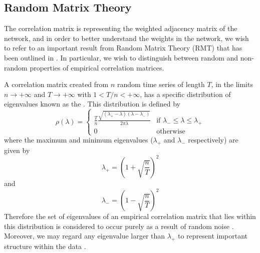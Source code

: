 
\subsection{Random Matrix Theory}
\label{subsec:randomMatrixTheory}

The correlation matrix is representing the weighted adjacency matrix of the network, and in order to better understand the weights in the network, we wish to refer to an important result from Random Matrix Theory (RMT) that has been outlined in \cite{SM99,PGR+99,PBL05,MG13}. In particular, we wish to distinguish between random and non-random properties of empirical correlation matrices.

A correlation matrix created from $n$ random time series of length $T$, in the limits $n \rightarrow +\infty$ and $T \rightarrow +\infty$ with $1 < T/n < +\infty$, has a specific distribution of eigenvalues known as the  \cite{SM99,PBL05,FPW+11,MG13}. This distribution is defined by 
\begin{equation}
	\label{def:senguptaMitraDistribution}
	\rho(\lambda) =	
	\begin{cases}
		\frac{T}{n}\frac{\sqrt{(\lambda_{+} - \lambda)(\lambda - \lambda_{-})}}{2\pi\lambda}& \text{if } \lambda_{-} \leq \lambda \leq \lambda_{+} \\
		0 & \text{otherwise}
	\end{cases}
\end{equation}
where the maximum and minimum eigenvalues ($\lambda_{+}$ and $\lambda_{-}$ respectively) are given by
\begin{equation}
\label{eq:maxEigenvalueSM}
	\lambda_{+} = \left(1+\sqrt{\frac{n}{T}}\right)^{2}
\end{equation}
and
\begin{equation}
\label{eq:minEigenvalueSM}
	\lambda_{-} = \left(1-\sqrt{\frac{n}{T}}\right)^{2}
\end{equation}
Therefore the set of eigenvalues of an empirical correlation matrix that lies within this distribution is considered to occur purely as a result of random noise \cite{PBL05,FPW+11,MG13}. Moreover, we may regard any eigenvalue larger than $\lambda_{+}$ to represent important structure within the data \cite{PBL05,FPW+11,MG13}.

